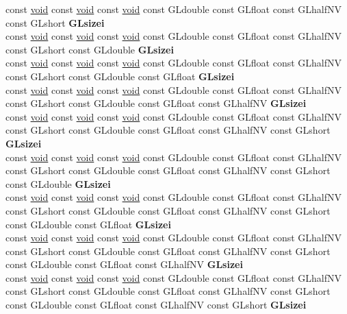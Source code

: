 \begin{DoxyCompactItemize}
\begin{tabbing}
\>const \hyperlink{interfacevoid}{void} const \hyperlink{interfacevoid}{void} const \hyperlink{interfacevoid}{void} const GLdouble const GLfloat const GLhalfNV const GLshort {\bfseries GLsizei}\\
\>const \hyperlink{interfacevoid}{void} const \hyperlink{interfacevoid}{void} const \hyperlink{interfacevoid}{void} const GLdouble const GLfloat const GLhalfNV const GLshort const GLdouble {\bfseries GLsizei}\\
\>const \hyperlink{interfacevoid}{void} const \hyperlink{interfacevoid}{void} const \hyperlink{interfacevoid}{void} const GLdouble const GLfloat const GLhalfNV const GLshort const GLdouble const GLfloat {\bfseries GLsizei}\\
\>const \hyperlink{interfacevoid}{void} const \hyperlink{interfacevoid}{void} const \hyperlink{interfacevoid}{void} const GLdouble const GLfloat const GLhalfNV const GLshort const GLdouble const GLfloat const GLhalfNV {\bfseries GLsizei}\\
\>const \hyperlink{interfacevoid}{void} const \hyperlink{interfacevoid}{void} const \hyperlink{interfacevoid}{void} const GLdouble const GLfloat const GLhalfNV const GLshort const GLdouble const GLfloat const GLhalfNV const GLshort {\bfseries GLsizei}\\
\>const \hyperlink{interfacevoid}{void} const \hyperlink{interfacevoid}{void} const \hyperlink{interfacevoid}{void} const GLdouble const GLfloat const GLhalfNV const GLshort const GLdouble const GLfloat const GLhalfNV const GLshort const GLdouble {\bfseries GLsizei}\\
\>const \hyperlink{interfacevoid}{void} const \hyperlink{interfacevoid}{void} const \hyperlink{interfacevoid}{void} const GLdouble const GLfloat const GLhalfNV const GLshort const GLdouble const GLfloat const GLhalfNV const GLshort const GLdouble const GLfloat {\bfseries GLsizei}\\
\>const \hyperlink{interfacevoid}{void} const \hyperlink{interfacevoid}{void} const \hyperlink{interfacevoid}{void} const GLdouble const GLfloat const GLhalfNV const GLshort const GLdouble const GLfloat const GLhalfNV const GLshort const GLdouble const GLfloat const GLhalfNV {\bfseries GLsizei}\\
\>const \hyperlink{interfacevoid}{void} const \hyperlink{interfacevoid}{void} const \hyperlink{interfacevoid}{void} const GLdouble const GLfloat const GLhalfNV const GLshort const GLdouble const GLfloat const GLhalfNV const GLshort const GLdouble const GLfloat const GLhalfNV const GLshort {\bfseries GLsizei}\\

\end{tabbing}
\end{DoxyCompactItemize}
